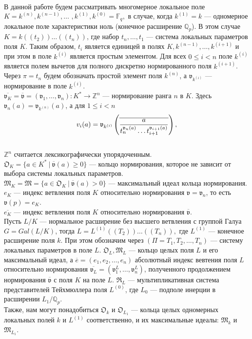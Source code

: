 \documentclass[a4paper]{article}
\newcommand{\Qp}{\mathbb{Q}_p}
\newcommand{\Fq}{\mathbb{F}_q}
\newcommand{\Z}{\mathbb{Z}}
\newcommand{\ML}{\mathfrak{M}_L}
\newcommand{\MLO}{\mathfrak{M}_{L_1}}
\newcommand{\MK}{\mathfrak{M}_K}
\newcommand{\Mk}{\mathfrak{M}_k}
\newcommand{\Ok}{\mathfrak{O}_k}
\newcommand{\OK}{\mathfrak{O}_K}
\newcommand{\OL}{\mathfrak{O}_L}
\newcommand{\OLO}{\mathfrak{O}_{L_1}}
\newcommand{\RL}{\mathfrak{R}_L}
\newcommand{\val}{\mathfrak{v}}
\newcommand{\olval}{\overline{\mathfrak{v}}}
\newcommand{\Leq}{\leqslant}
\newcommand{\Geq}{\geqslant}
\begin{document}
\paragraph{}
В данной работе будем рассматривать многомерное локальное поле $K=k^{(n)}, k^{(n-1)},\dots$ $,k^{(1)},k^{(0)}=\Fq,$ в случае, когда $k^{(1)} = k$ --- одномерное локальное поле характеристики ноль (конечное расширение $\Qp$). В этом случае $K = k((t_2))\dots((t_n))$, где набор $t_n,\dots,t_1$ --- система локальных параметров поля $K$. Таким образом, $t_i$ является единицей в полях $K,k^{(n-1)},\dots,k^{(i+1)}$ и при этом в поле $k^{(i)}$ является простым элементом. Для всех $0 \Leq i < n$ поле $k^{(i)}$ является полем вычетов для полного дискретно нормированного поля $k^{(i+1)}$. Через $\pi = t_n$ будем обозначать простой элемент поля $k^{(n)}$, а $\val_{k^{(i)}}$ --- нормирование в поле $k^{(i)}$.\\
$\overline{\val_K}=\olval=(\val_1,\dots,\val_n):K^*\rightarrow\Z^n$ --- нормирование ранга $n$ в $K$. Здесь $\val_n(a)=\val_{k^{(n)}}(a)$, а для $1\Leq i<n$
$$v_i(a) = \val_{k^{(i)}} \left( \overline {a \over { t_n^{\val_n(a)} \ldots t_{i+1}^{\val_{i+1}(a)} } } \right),$$\\
$\Z^n$ считается лексикографически упорядоченным.\\
$\OK=\{a\in K^*\ |\ \overline{\val}(a)\Geq0\}$ --- кольцо нормирования, которое не зависит от выбора системы локальных параметров.\\
$\MK=\mathfrak{M}=\{a\in\OK\ |\ \overline{\val}(a)>0\}$ --- максимальный идеал кольца нормирования.\\
$e_K$ --- индекс ветвления поля $K$ относительно нормирования $\val=\val_n$, то есть $\val(p)=e_K$.\\
$\overline{e_K}$ --- индекс ветвления поля $K$ относительно нормирования $\olval$.\\

Пусть $L/K$ --- нормальное расширение без высшего ветвления с группой Галуа $G=Gal(L/K)$, тогда $L = L^{(1)}((T_2))\dots((T_n)),$ где $L^{(1)}$ --- конечное расширение поля $k$. При этом обозначим через $(\Pi = T_1, T_2, \dots, T_n)$ --- систему локальных параметров в поле $L$.
$\OL,\ML$ --- кольцо целых поля $L$ и его максимальный идеал, а $\overline{e}=(e_1, e_2, \ldots, e_n)$ абсолютный индекс вевтения поля $L$ относительно нормирования $\overline{\val_L} = (\val_1^L, \ldots, \val_n^L)$, полученного продолжением нормирования $\olval$ с поля $K$ на поле $L$. $\RL$ --- мультипликативная система представителей Тейхмюллера поля $L^{(0)}$, где $L_0$ --- подполе инерции в расширении $L_1/\Qp$.\\
Также, нам могут понадобиться $\Ok$ и $\OLO$ --- кольца целых одномерных локальных полей $k$ и $L^{(1)}$ соответственно, и их максимальные идеалы: $\Mk$ и $\MLO$.
\end{document}

